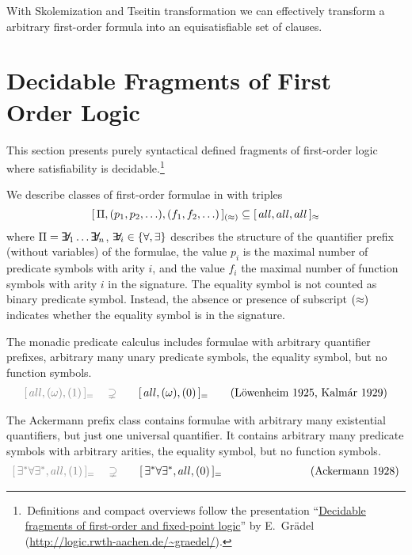 \begin{lemma}
With Skolemization and Tseitin transformation we can effectively transform a arbitrary first-order formula into an equisatisfiable set of clauses.	
\end{lemma}


\section{Decidable Fragments of First Order Logic}\label{sec:decidable:fol:fragments}

This section presents purely syntactical defined fragments
of first-order logic where satisfiability is decidable.\footnote{
	\,Definitions and compact overviews follow the presentation
	“\href{http://logic.rwth-aachen.de/~graedel/kalmar.pdf}{Decidable fragments of first-order and fixed-point logic}”
	by E.~Grädel (\url{http://logic.rwth-aachen.de/~graedel/}).	
}  





\begin{definition}[\cite{MR1482227}]\label{def:prefix:class}
	We describe classes of first-order formulae in \PNF with triples
	\[
	[\, \Pi, (p_1,p_2,\ldots), (f_1,f_2,\ldots)\,]_{(\approx)} \subseteq [\, all, all, all\,]_{\approx}
	\]
	where $\Pi = \quantify_1 \ldots \quantify_n$, $\quantify_i\in\{\forall,\exists\}$ 
	describes the structure of the quantifier prefix (without variables) of the formulae,
	the value $p_i$ is the maximal number of predicate symbols with arity $i$,
	and the value $f_i$ the maximal number of function symbols with arity $i$ in the signature.
	The equality symbol is not counted as binary predicate symbol. Instead,
	the absence or presence of subscript $(\approx)$ indicates whether the equality symbol is in the signature. 
\end{definition}

\begin{example}\label{ex:monadic}
	The monadic predicate calculus includes formulae with arbitrary quantifier prefixes, 
	arbitrary many unary predicate symbols, the equality symbol, but no function symbols.
	\begin{gather*}
	{\colG [\,all, (\omega), (1)\,]_= 
	\quad\supsetneq}\qquad 
	[\,all, (\omega), (0 ) \,]_=
	\tag{Löwenheim 1925, Kalmár 1929}
	\end{gather*}
\end{example}

\begin{example}\label{ex:ackermann}
	The Ackermann prefix class contains formulae with arbitrary many existential quantifiers, 
	but just one universal quantifier. It contains arbitrary many predicate symbols
	with arbitrary arities, the equality symbol, but no function symbols. 
	\begin{gather*}
	{\colG [\,\exists^*\forall\exists^*,all,(1)\,]_=
	\quad\supsetneq}\qquad
	[\,\exists^*\forall\exists^*,all,(0) \,]_{=}\qquad\qquad\qquad 
	\tag{Ackermann 1928}
	\end{gather*}
\end{example}

